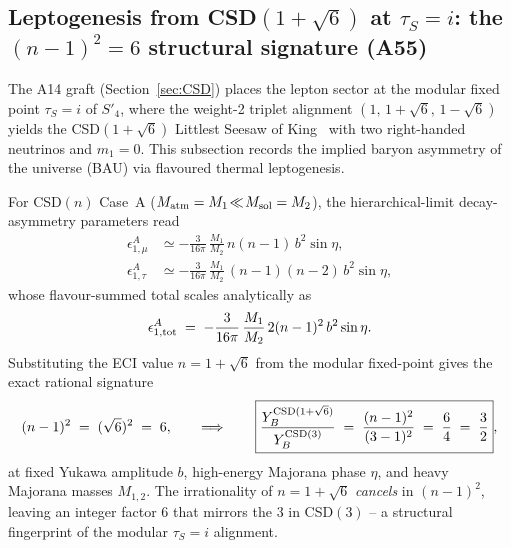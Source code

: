 \documentclass[a4paper,11pt]{article}
\newcommand{\Spf}{S'_4}
\theoremstyle{definition}
\theoremstyle{remark}
\begin{document}
\subsection{Leptogenesis from CSD$(1+\sqrt 6)$ at
            $\tau_S=i$: the $(n-1)^2=6$ structural
            signature (A55)}
\label{sec:lepto}

The A14 graft (Section~\ref{sec:CSD}) places the lepton sector
at the modular fixed point $\tau_S=i$ of $\Spf$, where the
weight-2 triplet alignment $(1,\,1+\sqrt 6,\,1-\sqrt 6)$ yields
the CSD$(1+\sqrt 6)$ Littlest Seesaw of King~\cite{LMS22,LS16}
with two right-handed neutrinos and $m_1=0$.  This subsection
records the implied baryon asymmetry of the universe (BAU) via
flavoured thermal leptogenesis.

For CSD$(n)$ Case~A ($M_{\rm atm}=M_1\!\ll\! M_{\rm sol}=M_2$),
the hierarchical-limit decay-asymmetry parameters
\cite{KMSR18} read
\begin{align}
\epsilon^A_{1,\mu}  &\simeq -\frac{3}{16\pi}\,\frac{M_1}{M_2}\,n(n-1)\,b^2 \sin\eta,\\
\epsilon^A_{1,\tau} &\simeq -\frac{3}{16\pi}\,\frac{M_1}{M_2}\,(n-1)(n-2)\,b^2 \sin\eta,
\end{align}
whose flavour-summed total scales analytically as
\begin{equation}
  \epsilon^A_{1,{\rm tot}}
  \;=\;-\frac{3}{16\pi}\,\frac{M_1}{M_2}\,2(n-1)^2\,b^2\sin\eta.
  \label{eq:eps-tot-v75}
\end{equation}
Substituting the ECI value $n=1+\sqrt 6$ from the modular
fixed-point gives the exact rational signature
\begin{equation}
  (n-1)^2 \;=\; (\sqrt 6)^2 \;=\; 6,
  \qquad\Longrightarrow\qquad
  \boxed{
    \frac{Y_B^{\rm CSD(1+\sqrt 6)}}{Y_B^{\rm CSD(3)}}
    \;=\;\frac{(n-1)^2}{(3-1)^2} \;=\; \frac{6}{4} \;=\; \frac{3}{2}
  } ,
  \label{eq:ratio-v75}
\end{equation}
at fixed Yukawa amplitude $b$, high-energy Majorana phase
$\eta$, and heavy Majorana masses $M_{1,2}$.  The
irrationality of $n=1+\sqrt 6$ \emph{cancels} in $(n-1)^2$,
leaving an integer factor $6$ that mirrors the $3$ in
CSD$(3)$ -- a structural fingerprint of the modular
$\tau_S=i$ alignment.
\end{document}
